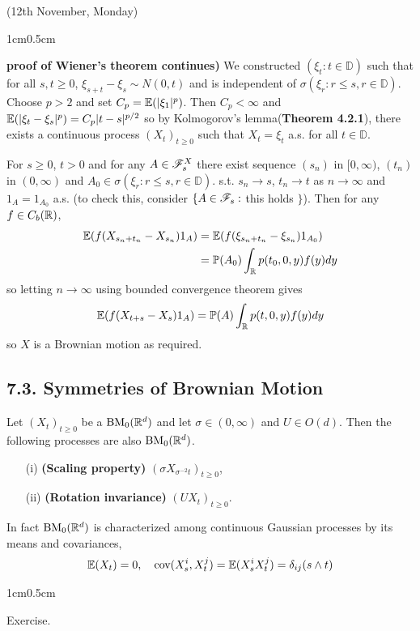 \documentclass[12pt,a4paper]{report}
\newenvironment{proof}
{\begin{changemargin}{1cm}{0.5cm} 
	}%
	{\end{changemargin}
}
\begin{document}
\newday

(12th November, Monday)
\s

\begin{proof}
\textbf{proof of Wiener's theorem continues)} We constructed $(\xi_t : t\in \mathbb{D})$ such that for all $s,t\geq 0$, $\xi_{s+t} -\xi_s \sim N(0,t)$ and is independent of $\sigma(\xi_r : r\leq s , r\in \mathbb{D})$. Choose $p>2$ and set $C_p = \mathbb{E}(|\xi_1|^p)$. Then $C_p <\infty$ and $\mathbb{E}(|\xi_t - \xi_s|^p) = C_p|t-s|^{p/2}$ so by Kolmogorov's lemma(\textbf{Theorem 4.2.1}), there exists a continuous process $(X_t)_{t\geq 0}$ such that $X_t = \xi_t$ a.s. for all $t\in \mathbb{D}$.
\s

For $s\geq 0$, $t>0$ and for any $A\in \mathscr{F}_s^X$ there exist sequence $(s_n)$ in $[0,\infty)$, $(t_n)$ in $(0,\infty)$ and $A_0 \in \sigma(\xi_r : r\leq s, r \in \mathbb{D} )$. s.t. $s_n \rightarrow s$, $t_n \rightarrow t$ as $n\rightarrow \infty$ and $1_A =1_{A_0}$ a.s. (to check this, consider $\{ A \in \mathscr{F}_s : $ this holds $\}$). Then for any $f\in C_b(\mathbb{R})$,
\begin{align*}
\mathbb{E}(f (X_{s_n + t_n} - X_{s_n})1_A) &= \mathbb{E}( f(\xi_{s_n + t_n} - \xi_{s_n})1_{A_0} ) \\
&= \mathbb{P}(A_0) \int_{\mathbb{R}} p(t_0, 0,y) f(y)dy
\end{align*}
so letting $n\rightarrow \infty$ using bounded convergence theorem gives
\begin{align*}
\mathbb{E}(f(X_{t+s}-X_s)1_{A}) = \mathbb{P}(A) \int_{\mathbb{R}} p(t,0,y) f(y)dy
\end{align*}
so $X$ is a Brownian motion as required.

\eop
\end{proof}

\subsection*{7.3. Symmetries of Brownian Motion}

 Let $(X_t)_{t\geq 0}$ be a $\text{BM}_0(\mathbb{R}^d)$ and let $\sigma \in (0,\infty)$ and $U\in O(d)$. Then the following processes are also $\text{BM}_0(\mathbb{R}^d)$.
\begin{itemize}
\item[(i)] \textbf{(Scaling property)} $(\sigma X_{\sigma^{-2}t})_{t\geq 0}$,
\item[(ii)] \textbf{(Rotation invariance)} $(UX_t)_{t\geq 0}$.
\end{itemize}
In fact $\text{BM}_0(\mathbb{R}^d)$ is characterized among continuous Gaussian processes by its means and covariances,
\begin{align*}
\mathbb{E}(X_t) =0, \quad \text{cov}(X_s^i, X_t^j) = \mathbb{E}(X^i_s X^j_t) = \delta_{ij} (s\wedge t)
\end{align*}
\begin{proof}
\pf Exercise.
\end{proof}
\end{document}
